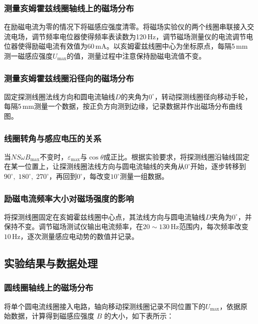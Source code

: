 \documentclass[UTF8]{article}
\theoremstyle{MyLineTheoremStyle} %
\theoremstyle{MyBlockTheoremStyle} %
\theoremstyle{MySubsubsectionStyle} %
\begin{document}
\subsubsection{测量亥姆霍兹线圈轴线上的磁场分布}
在励磁电流为零的情况下将磁感应强度清零。将磁场实验仪的两个线圈串联接入交流电场，调节频率电位器使得频率表读数为120\,Hz，调节磁场测量仪的电流调节电位器使得励磁电流有效值为60\,mA。以亥姆霍兹线圈中心为坐标原点，每隔5\,mm测一磁感应强度$ U_{\max} $的值，测量过程中注意保持励磁电流值不变。
\subsubsection{测量亥姆霍兹线圈沿径向的磁场分布}
固定探测线圈法线方向和圆电流轴线$ D $的夹角为$ 0^\circ $，转动探测线圈径向移动手轮，每隔5\,mm测量一个数据，按正负方向测到边缘，记录数据并作出磁场分布曲线图。
\subsubsection{线圈转角与感应电压的关系}
当$ NS\omega B_{\max} $不变时，$ \varepsilon_{\max} $与$ \cos\theta $成正比。根据实验要求，将探测线圈沿轴线固定在某一位置上，让探测线圈法线方向与圆电流轴线的夹角从$ 0^\circ $开始，逐步转移到$ 90^\circ,\;180^\circ,\;270^\circ $，再回到$ 0^\circ $，每改变$ 10^\circ $测量一组数据。
\subsubsection{励磁电流频率大小对磁场强度的影响}
将探测线圈固定在亥姆霍兹线圈中心点，其法线方向与圆电流轴线$ D $夹角为$ 0^\circ $，并保持不变。调节磁场测试仪输出电流频率，在$ 20\sim 130\,\mathrm{Hz} $范围内，每次频率改变$ 10\,\mathrm{Hz} $，逐次测量感应电动势的数值并记录。

\subsection{实验结果与数据处理}
\subsubsection{圆线圈轴线上的磁场分布}
将单个圆电流线圈接入电路，轴向移动探测线圈记录不同位置下的$ U_{\max} $，依据原始数据，计算得到磁感应强度 $B$ 的大小，如下表所示：
\end{document}
